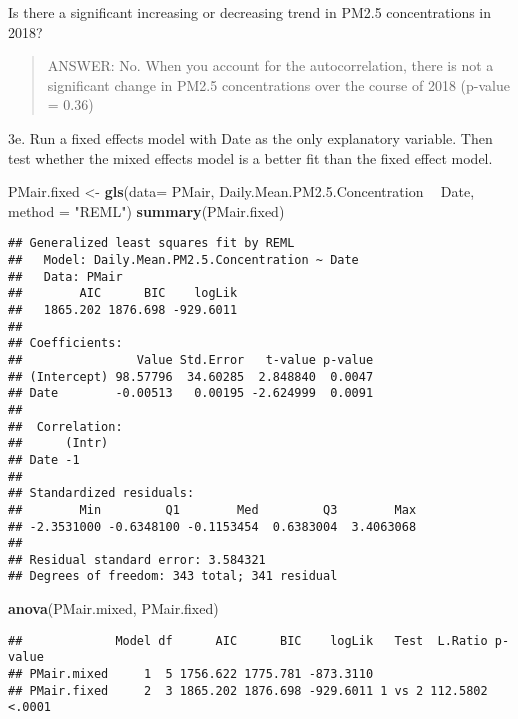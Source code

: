 \documentclass[]{article}
\newenvironment{Shaded}{\begin{snugshade}}{\end{snugshade}}
\newcommand{\KeywordTok}[1]{\textcolor[rgb]{0.13,0.29,0.53}{\textbf{#1}}}
\newcommand{\DataTypeTok}[1]{\textcolor[rgb]{0.13,0.29,0.53}{#1}}
\newcommand{\FloatTok}[1]{\textcolor[rgb]{0.00,0.00,0.81}{#1}}
\newcommand{\StringTok}[1]{\textcolor[rgb]{0.31,0.60,0.02}{#1}}
\newcommand{\OperatorTok}[1]{\textcolor[rgb]{0.81,0.36,0.00}{\textbf{#1}}}
\newcommand{\NormalTok}[1]{#1}
\begin{document}
Is there a significant increasing or decreasing trend in PM2.5
concentrations in 2018?

\begin{quote}
ANSWER: No. When you account for the autocorrelation, there is not a
significant change in PM2.5 concentrations over the course of 2018
(p-value = 0.36)
\end{quote}

3e. Run a fixed effects model with Date as the only explanatory
variable. Then test whether the mixed effects model is a better fit than
the fixed effect model.

\begin{Shaded}
\begin{Highlighting}[]
\NormalTok{PMair.fixed <-}\StringTok{ }\KeywordTok{gls}\NormalTok{(}\DataTypeTok{data=}\NormalTok{ PMair, Daily.Mean.PM2.}\FloatTok{5.}\NormalTok{Concentration }\OperatorTok{~}\StringTok{ }\NormalTok{Date, }\DataTypeTok{method =} \StringTok{"REML"}\NormalTok{)}
\KeywordTok{summary}\NormalTok{(PMair.fixed)}
\end{Highlighting}
\end{Shaded}

\begin{verbatim}
## Generalized least squares fit by REML
##   Model: Daily.Mean.PM2.5.Concentration ~ Date 
##   Data: PMair 
##        AIC      BIC    logLik
##   1865.202 1876.698 -929.6011
## 
## Coefficients:
##                Value Std.Error   t-value p-value
## (Intercept) 98.57796  34.60285  2.848840  0.0047
## Date        -0.00513   0.00195 -2.624999  0.0091
## 
##  Correlation: 
##      (Intr)
## Date -1    
## 
## Standardized residuals:
##        Min         Q1        Med         Q3        Max 
## -2.3531000 -0.6348100 -0.1153454  0.6383004  3.4063068 
## 
## Residual standard error: 3.584321 
## Degrees of freedom: 343 total; 341 residual
\end{verbatim}

\begin{Shaded}
\begin{Highlighting}[]
\KeywordTok{anova}\NormalTok{(PMair.mixed, PMair.fixed)}
\end{Highlighting}
\end{Shaded}

\begin{verbatim}
##             Model df      AIC      BIC    logLik   Test  L.Ratio p-value
## PMair.mixed     1  5 1756.622 1775.781 -873.3110                        
## PMair.fixed     2  3 1865.202 1876.698 -929.6011 1 vs 2 112.5802  <.0001
\end{verbatim}
\end{document}
